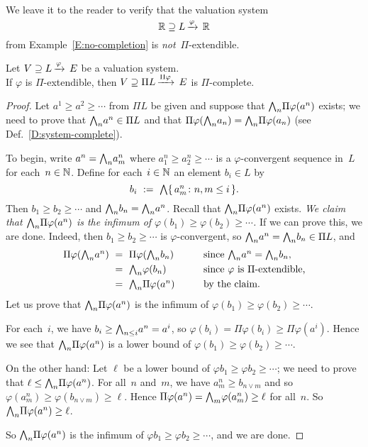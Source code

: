 \documentclass[main.tex]{subfiles}
\begin{document}
\begin{ex}
We leave it to the reader
to verify
that the  valuation system
\begin{equation*}
\mathbb{R} \supseteq L\,\smash{\xrightarrow{\varphi}\,\mathbb{R}}
\end{equation*}
from Example~\ref{E:no-completion}
is \emph{not}~$\Pi$-extendible.
\end{ex}
%
%
\begin{lem}
\label{L:Pi-complete}
Let $V \supseteq L\,\smash{\xrightarrow{\varphi}\,E}$ be a valuation system.\\
If $\varphi$ is $\Pi$-extendible,
then $V \supseteq \Pi L\,\smash{\xrightarrow{\Pi\varphi}\,E}$ is $\Pi$-complete.
\end{lem}
\begin{proof}
Let $a^1 \geq a^2 \geq \dotsb $ from $\Pi L$
be given and suppose that $\textstyle{\bigwedge}_n \Pi \varphi (a^n)$ exists;
we need to prove that $\textstyle{\bigwedge}_n a^n \in \Pi L$
and that $\Pi\varphi(\textstyle{\bigwedge}_n a_n) = \textstyle{\bigwedge}_n \Pi \varphi(a_n )$
(see Def.~\ref{D:system-complete}).

To begin, write
$a^n = \textstyle{\bigwedge}_n a^n_m$
where $a^n_1 \geq a^n_2 \geq \dotsb$
is a $\varphi$-convergent sequence in~$L$
for each~$n\in\mathbb{N}$.
Define for each~$i\in\mathbb{N}$
an element $b_i \in L$ by
\begin{equation*}
b_i \ :=\ \textstyle{\bigwedge}\{\,a^n_m\colon n,m\leq i \,\}.
\end{equation*}
Then $b_1 \geq b_2 \geq \dotsb$
and $\textstyle{\bigwedge}_n b_n = \textstyle{\bigwedge}_n a^n$.
Recall that  $\textstyle{\bigwedge}_n \Pi\varphi(a^n)$
exists.
\emph{%
We claim that $\textstyle{\bigwedge}_n \Pi\varphi(a^n)$
is the infimum of $\varphi (b_1) \geq \varphi (b_2) \geq \dotsb$.%
}
If we can prove this, we are done.
Indeed,
then $b_1 \geq b_2 \geq\dotsb$ is $\varphi$-convergent,
so $\textstyle{\bigwedge}_n a^n = \textstyle{\bigwedge}_n b_n \in \Pi L$,
and
\begin{alignat*}{3}
\Pi\varphi( \textstyle{\bigwedge}_n a^n ) \ &=\  \Pi\varphi( \textstyle{\bigwedge}_n b_n )
 \qquad&& \text{since $\textstyle{\bigwedge}_n a^n = \textstyle{\bigwedge}_n b_n$}, \\
&=\ \textstyle{\bigwedge}_n \varphi (b_n)  
  && \text{since $\varphi$ is $\Pi$-extendible,}\\
&=\ \textstyle{\bigwedge}_n \Pi\varphi(a^n) 
  && \text{by the claim.}
\end{alignat*}
Let us prove that 
 $\textstyle{\bigwedge}_n \Pi\varphi(a^n)$
is the infimum of $\varphi (b_1) \geq \varphi (b_2) \geq \dotsb$.

For each~$i$,
we have $b_i \geq \textstyle{\bigwedge}_{n\leq i} a^n = a^i$,
so $\varphi(b_i) = \Pi\varphi(b_i) \geq \Pi\varphi(a^i)$.
Hence we see that
$\textstyle{\bigwedge}_n \Pi\varphi(a^n)$ is a lower bound of
$\varphi(b_1)\geq \varphi(b_2) \geq \dotsb$.

On the other hand:
Let $\ell$ be a lower bound of $\varphi b_1 \geq \varphi b_2 \geq \dotsb$;
we need to prove that $\ell \leq \textstyle{\bigwedge}_n \Pi\varphi(a^n)$.
For all~$n$ and~$m$,
we have $a_m^n \geq b_{n\vee m}$
and so $\varphi(a_m^n) \geq \varphi(b_{n\vee m}) \geq \ell$.
Hence $\Pi\varphi(a^n) = \textstyle{\bigwedge}_m \varphi(a_m^n) \geq \ell$
for all~$n$.
So $\textstyle{\bigwedge}_n \Pi\varphi(a^n) \geq \ell$.

So $\textstyle{\bigwedge}_n \Pi\varphi(a^n)$ is the infimum of 
$\varphi b_1 \geq \varphi b_2 \geq \dotsb$,
and we are done.
\end{proof}
\end{document}
